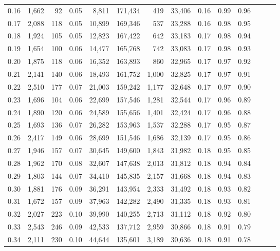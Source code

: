 \begin{tabular}{rrrrrrrrrrrrrr}
0.16 &  1,662 &   92 &  0.05 &    8,811 &  171,434 &     419 &  33,406 &  0.16 &  0.99 &      0.96 \\
0.17 &  2,088 &  118 &  0.05 &   10,899 &  169,346 &     537 &  33,288 &  0.16 &  0.98 &      0.95 \\
0.18 &  1,924 &  105 &  0.05 &   12,823 &  167,422 &     642 &  33,183 &  0.17 &  0.98 &      0.94 \\
0.19 &  1,654 &  100 &  0.06 &   14,477 &  165,768 &     742 &  33,083 &  0.17 &  0.98 &      0.93 \\
0.20 &  1,875 &  118 &  0.06 &   16,352 &  163,893 &     860 &  32,965 &  0.17 &  0.97 &      0.92 \\
0.21 &  2,141 &  140 &  0.06 &   18,493 &  161,752 &   1,000 &  32,825 &  0.17 &  0.97 &      0.91 \\
0.22 &  2,510 &  177 &  0.07 &   21,003 &  159,242 &   1,177 &  32,648 &  0.17 &  0.97 &      0.90 \\
0.23 &  1,696 &  104 &  0.06 &   22,699 &  157,546 &   1,281 &  32,544 &  0.17 &  0.96 &      0.89 \\
0.24 &  1,890 &  120 &  0.06 &   24,589 &  155,656 &   1,401 &  32,424 &  0.17 &  0.96 &      0.88 \\
0.25 &  1,693 &  136 &  0.07 &   26,282 &  153,963 &   1,537 &  32,288 &  0.17 &  0.95 &      0.87 \\
0.26 &  2,417 &  149 &  0.06 &   28,699 &  151,546 &   1,686 &  32,139 &  0.17 &  0.95 &      0.86 \\
0.27 &  1,946 &  157 &  0.07 &   30,645 &  149,600 &   1,843 &  31,982 &  0.18 &  0.95 &      0.85 \\
0.28 &  1,962 &  170 &  0.08 &   32,607 &  147,638 &   2,013 &  31,812 &  0.18 &  0.94 &      0.84 \\
0.29 &  1,803 &  144 &  0.07 &   34,410 &  145,835 &   2,157 &  31,668 &  0.18 &  0.94 &      0.83 \\
0.30 &  1,881 &  176 &  0.09 &   36,291 &  143,954 &   2,333 &  31,492 &  0.18 &  0.93 &      0.82 \\
0.31 &  1,672 &  157 &  0.09 &   37,963 &  142,282 &   2,490 &  31,335 &  0.18 &  0.93 &      0.81 \\
0.32 &  2,027 &  223 &  0.10 &   39,990 &  140,255 &   2,713 &  31,112 &  0.18 &  0.92 &      0.80 \\
0.33 &  2,543 &  246 &  0.09 &   42,533 &  137,712 &   2,959 &  30,866 &  0.18 &  0.91 &      0.79 \\
0.34 &  2,111 &  230 &  0.10 &   44,644 &  135,601 &   3,189 &  30,636 &  0.18 &  0.91 &      0.78 \\

\end{tabular}
